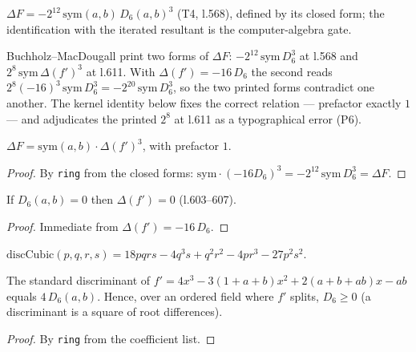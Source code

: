 \begin{definition}[$\Delta F$]\label{deltaF}\leanok
{}
$\Delta F=-2^{12}\,\mathrm{sym}(a,b)\,D_{6}(a,b)^{3}$ (T4, l.568), defined by its closed
form; the identification with the iterated resultant is the computer-algebra gate.
\end{definition}

Buchholz--MacDougall print two forms of $\Delta F$: $-2^{12}\,\mathrm{sym}\,D_{6}^{3}$
at l.568 and $2^{8}\,\mathrm{sym}\,\Delta(f')^{3}$ at l.611.  With
$\Delta(f')=-16\,D_{6}$ the second reads $2^{8}(-16)^{3}\,\mathrm{sym}\,D_{6}^{3}
=-2^{20}\,\mathrm{sym}\,D_{6}^{3}$, so the two printed forms contradict one another.
The kernel identity below fixes the correct relation --- prefactor exactly $1$ --- and
adjudicates the printed $2^{8}$ at l.611 as a typographical error (P6).

\begin{theorem}\label{deltaF_eq_sym_mul_deltaFp_cubed}\leanok
{}
$\Delta F=\mathrm{sym}(a,b)\cdot\Delta(f')^{3}$, with prefactor $1$.
\end{theorem}
\begin{proof}\leanok
By \texttt{ring} from the closed forms: $\mathrm{sym}\cdot(-16D_{6})^{3}
=-2^{12}\,\mathrm{sym}\,D_{6}^{3}=\Delta F$.
\end{proof}

\begin{theorem}\label{deltaFp_eq_zero_of_D6}\leanok
{}
If $D_{6}(a,b)=0$ then $\Delta(f')=0$ (l.603--607).
\end{theorem}
\begin{proof}\leanok
Immediate from $\Delta(f')=-16\,D_{6}$.
\end{proof}

\begin{definition}\label{discCubic}\leanok
$\mathrm{discCubic}(p,q,r,s)=18pqrs-4q^{3}s+q^{2}r^{2}-4pr^{3}-27p^{2}s^{2}$.
\end{definition}

\begin{theorem}\label{discCubic_fp_eq_four_D6}\leanok
{}
The standard discriminant of $f'=4x^{3}-3(1+a+b)x^{2}+2(a+b+ab)x-ab$ equals
$4\,D_{6}(a,b)$.  Hence, over an ordered field where $f'$ splits, $D_{6}\geq 0$ (a
discriminant is a square of root differences).
\end{theorem}
\begin{proof}\leanok
By \texttt{ring} from the coefficient list.
\end{proof}

